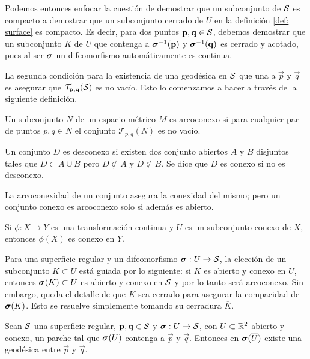 Podemos entonces enfocar la cuestión de demostrar que un subconjunto de $\mathcal S$ es compacto a demostrar que un subconjunto cerrado de $U$ en la definición \ref{def: surface} es compacto. Es decir, para dos puntos $\mathbf p, \mathbf q \in \mathcal S$, debemos demostrar que un subconjunto $K$ de $U$ que contenga a $\boldsymbol{\sigma}^{-1}(\mathbf p)$ y $\boldsymbol{\sigma}^{-1}(\mathbf q)$ es cerrado y acotado, pues al ser $\boldsymbol{\sigma}$ un difeomorfismo automáticamente es continua.

La segunda condición para la existencia de una geodésica en $\mathcal S$ que una a $\vec p$ y $\vec q$ es asegurar que $\mathcal T_{\mathbf p, \mathbf q}(\mathcal S)$ es no vacío. Esto lo comenzamos a hacer a través de la siguiente definición.
\begin{definition}[Arcoconexidad]
	Un subconjunto $N$ de un espacio métrico $M$ es arcoconexo si para cualquier par de puntos $p, q \in N$ el conjunto $\mathcal T_{p, q}(N)$ es no vacío.
\end{definition}

\begin{definition}[Conexidad]
	Un conjunto $D$ es desconexo si existen dos conjunto abiertos $A$ y $B$ disjuntos tales que $D \subset A \cup B$ pero $D \not\subset A$ y $D \not\subset B$. Se dice que $D$ es conexo si no es desconexo.
\end{definition}

La arcoconexidad de un conjunto asegura la conexidad del mismo; pero un conjunto conexo es arcoconexo solo si además es abierto.

\begin{proposition}
	Si $\phi : X \to Y$ es una transformación continua y $U$ es un subconjunto conexo de $X$, entonces $\phi(X)$ es conexo en $Y$.
\end{proposition}

Para una superficie regular y un difeomorfismo $\boldsymbol{\sigma} : U \to \mathcal S$, la elección de un subconjunto $K \subset U$ está guiada por lo siguiente: si $K$ es abierto y conexo en $U$, entonces $\boldsymbol{\sigma}(K) \subset U$ es abierto y conexo en $\mathcal S$ y por lo tanto será arcoconexo.
Sin embargo, queda el detalle de que $K$ sea cerrado para asegurar la compacidad de $\boldsymbol{\sigma}(K)$. Esto se resuelve simplemente tomando su cerradura $\overline K$.

\begin{proposition}
	Sean $\mathcal S$ una superficie regular, $\mathbf p, \mathbf q \in \mathcal S$ y $\boldsymbol{\sigma} : U \to \mathcal S$, con $U \subset \mathbb R^2$ abierto y conexo, un parche tal que $\boldsymbol{\sigma}(U)$ contenga a $\vec p$ y $\vec q$. Entonces en $\boldsymbol{\sigma}(\overline U)$ existe una geodésica entre $\vec p$ y $\vec q$.
\end{proposition}

